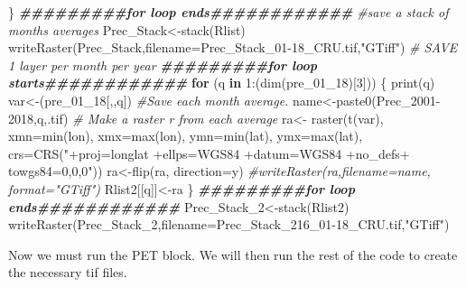 \documentclass[
  10pt,
  b5paper,
]{book}
\newenvironment{Shaded}{\begin{snugshade}}{\end{snugshade}}
\newcommand{\AttributeTok}[1]{\textcolor[rgb]{0.77,0.63,0.00}{#1}}
\newcommand{\CommentTok}[1]{\textcolor[rgb]{0.56,0.35,0.01}{\textit{#1}}}
\newcommand{\ControlFlowTok}[1]{\textcolor[rgb]{0.13,0.29,0.53}{\textbf{#1}}}
\newcommand{\DecValTok}[1]{\textcolor[rgb]{0.00,0.00,0.81}{#1}}
\newcommand{\DocumentationTok}[1]{\textcolor[rgb]{0.56,0.35,0.01}{\textbf{\textit{#1}}}}
\newcommand{\FunctionTok}[1]{\textcolor[rgb]{0.00,0.00,0.00}{#1}}
\newcommand{\NormalTok}[1]{#1}
\newcommand{\OtherTok}[1]{\textcolor[rgb]{0.56,0.35,0.01}{#1}}
\newcommand{\SpecialCharTok}[1]{\textcolor[rgb]{0.00,0.00,0.00}{#1}}
\newcommand{\StringTok}[1]{\textcolor[rgb]{0.31,0.60,0.02}{#1}}
\begin{document}
\begin{Shaded}
\begin{Highlighting}[]
\NormalTok{\}}
\DocumentationTok{\#\#\#\#\#\#\#\#\#for loop ends\#\#\#\#\#\#\#\#\#\#\#\#}
 \CommentTok{\#save a stack of months averages}
\NormalTok{ Prec\_Stack}\OtherTok{\textless{}{-}}\FunctionTok{stack}\NormalTok{(Rlist)}
\FunctionTok{writeRaster}\NormalTok{(Prec\_Stack,}\AttributeTok{filename=}\StringTok{\textquotesingle{}Prec\_Stack\_01{-}18\_CRU.tif\textquotesingle{}}\NormalTok{,}\StringTok{"GTiff"}\NormalTok{)}
 \CommentTok{\# SAVE 1 layer per month per year}
\DocumentationTok{\#\#\#\#\#\#\#\#\#for loop starts\#\#\#\#\#\#\#\#\#\#\#\#}
 \ControlFlowTok{for}\NormalTok{ (q }\ControlFlowTok{in} \DecValTok{1}\SpecialCharTok{:}\NormalTok{(}\FunctionTok{dim}\NormalTok{(pre\_01\_18)[}\DecValTok{3}\NormalTok{])) \{}
\FunctionTok{print}\NormalTok{(q)}
\NormalTok{var}\OtherTok{\textless{}{-}}\NormalTok{(pre\_01\_18[,,q])}
 \CommentTok{\#Save each month average. }
\NormalTok{ name}\OtherTok{\textless{}{-}}\FunctionTok{paste0}\NormalTok{(}\StringTok{\textquotesingle{}Prec\_2001{-}2018\textquotesingle{}}\NormalTok{,q,}\StringTok{\textquotesingle{}.tif\textquotesingle{}}\NormalTok{)}
 \CommentTok{\# Make a raster r from each average}
\NormalTok{ra}\OtherTok{\textless{}{-}} \FunctionTok{raster}\NormalTok{(}\FunctionTok{t}\NormalTok{(var), }\AttributeTok{xmn=}\FunctionTok{min}\NormalTok{(lon), }\AttributeTok{xmx=}\FunctionTok{max}\NormalTok{(lon), }\AttributeTok{ymn=}\FunctionTok{min}\NormalTok{(lat), }\AttributeTok{ymx=}\FunctionTok{max}\NormalTok{(lat), }\AttributeTok{crs=}\FunctionTok{CRS}\NormalTok{(}\StringTok{"+proj=longlat +ellps=WGS84 +datum=WGS84 +no\_defs+ towgs84=0,0,0"}\NormalTok{))}
\NormalTok{ra}\OtherTok{\textless{}{-}}\FunctionTok{flip}\NormalTok{(ra, }\AttributeTok{direction=}\StringTok{\textquotesingle{}y\textquotesingle{}}\NormalTok{)}
\CommentTok{\#writeRaster(ra,filename=name, format="GTiff")}
\NormalTok{Rlist2[[q]]}\OtherTok{\textless{}{-}}\NormalTok{ra}
\NormalTok{\}}
\DocumentationTok{\#\#\#\#\#\#\#\#\#for loop ends\#\#\#\#\#\#\#\#\#\#\#\#}
\NormalTok{Prec\_Stack\_2}\OtherTok{\textless{}{-}}\FunctionTok{stack}\NormalTok{(Rlist2)}
\FunctionTok{writeRaster}\NormalTok{(Prec\_Stack\_2,}\AttributeTok{filename=}\StringTok{\textquotesingle{}Prec\_Stack\_216\_01{-}18\_CRU.tif\textquotesingle{}}\NormalTok{,}\StringTok{"GTiff"}\NormalTok{) }
\end{Highlighting}
\end{Shaded}

Now we must run the PET block. We will then run the rest of the code to create the necessary tif files.
\end{document}
